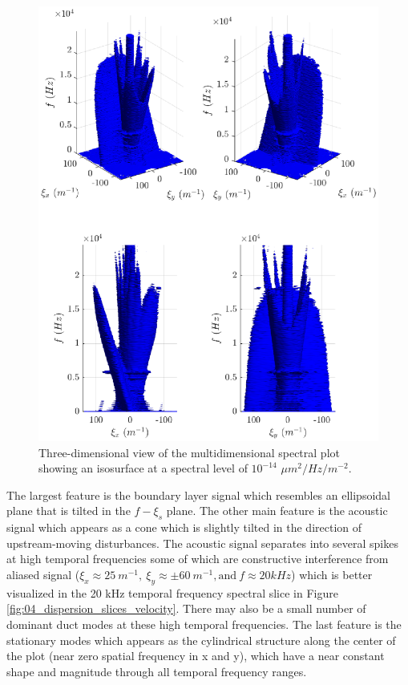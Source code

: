 \begin{figure}
  \centering
  \includegraphics{../matlab/04_dispersion_analysis/dispersion_3d.eps}
  \caption{Three-dimensional view of the multidimensional spectral plot showing an isosurface at a spectral level of $10^{-14}$ $\mu m^2/Hz/m^{-2}$.}
  \label{fig:04_dispersion_3d}
\end{figure}
The largest feature is the boundary layer signal which resembles an ellipsoidal plane that is tilted in the $f-\xi_s$ plane.
The other main feature is the acoustic signal which appears as a cone which is slightly tilted in the direction of upstream-moving disturbances.
The acoustic signal separates into several spikes at high temporal frequencies some of which are constructive interference from aliased signal ($\xi_x\approx25\ m^{-1},\ \xi_y\approx\pm60\ m^{-1}, \textrm{and}\ f\approx20 kHz$) which is better visualized in the 20 kHz temporal frequency spectral slice in Figure \ref{fig:04_dispersion_slices_velocity}.
There may also be a small number of dominant duct modes at these high temporal frequencies.
The last feature is the stationary modes which appears as the cylindrical structure along the center of the plot (near zero spatial frequency in x and y), which have a near constant shape and magnitude through all temporal frequency ranges.

